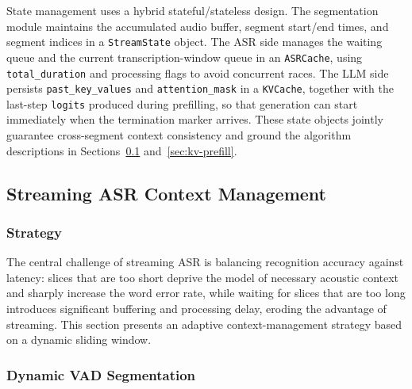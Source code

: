 \documentclass[pdflatex,iicol,Numbered,sn-basic]{sn-jnl}%
\begin{document}
State management uses a hybrid stateful/stateless design. The segmentation module maintains the accumulated audio buffer, segment start/end times, and segment indices in a \texttt{StreamState} object. The ASR side manages the waiting queue and the current transcription-window queue in an \texttt{ASRCache}, using \texttt{total\_duration} and processing flags to avoid concurrent races. The LLM side persists \texttt{past\_key\_values} and \texttt{attention\_mask} in a \texttt{KVCache}, together with the last-step \texttt{logits} produced during prefilling, so that generation can start immediately when the termination marker arrives. These state objects jointly guarantee cross-segment context consistency and ground the algorithm descriptions in Sections~\ref{sec:asr-context} and~\ref{sec:kv-prefill}.

\subsection{Streaming ASR Context Management}\label{sec:asr-context}

\subsubsection{Strategy}

The central challenge of streaming ASR is balancing recognition accuracy against latency: slices that are too short deprive the model of necessary acoustic context and sharply increase the word error rate, while waiting for slices that are too long introduces significant buffering and processing delay, eroding the advantage of streaming. This section presents an adaptive context-management strategy based on a dynamic sliding window.

\subsubsection{Dynamic VAD Segmentation}
\end{document}
